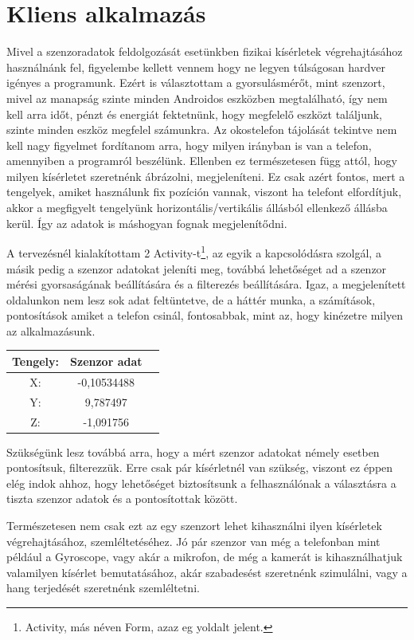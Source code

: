 \documentclass{thesis-ekf}
\theoremstyle{definition}
\theoremstyle{remark}
\begin{document}
\chapter{Kliens alkalmazás}
Mivel a szenzoradatok feldolgozását esetünkben fizikai kísérletek végrehajtásához használnánk fel, figyelembe kellett vennem hogy ne legyen túlságosan hardver igényes a programunk. Ezért is választottam a gyorsulásmérőt, mint szenzort, mivel az manapság szinte minden Androidos eszközben megtalálható, így nem kell arra időt, pénzt és energiát fektetnünk, hogy megfelelő eszközt találjunk, szinte minden eszköz megfelel számunkra. Az okostelefon tájolását tekintve nem kell nagy figyelmet fordítanom arra, hogy milyen irányban is van a telefon, amennyiben a programról beszélünk. Ellenben ez természetesen függ attól, hogy milyen kísérletet szeretnénk ábrázolni, megjeleníteni. Ez csak azért fontos, mert a tengelyek, amiket használunk fix pozíción vannak, viszont ha telefont elfordítjuk, akkor a megfigyelt tengelyünk horizontális/vertikális állásból ellenkező állásba kerül. Így az adatok is máshogyan fognak megjelenítődni.
\par A tervezésnél kialakítottam 2 Activity-t\footnote{Activity, más néven Form, azaz eg yoldalt jelent.}, az egyik a kapcsolódásra szolgál, a másik pedig a szenzor adatokat jeleníti meg, továbbá lehetőséget ad a szenzor mérési gyorsaságának beállítására és a filterezés beállítására. Igaz, a megjelenített oldalunkon nem lesz sok adat feltüntetve, de a háttér munka, a számítások, pontosítások amiket a telefon csinál, fontosabbak, mint az, hogy kinézetre milyen az alkalmazásunk.
\begin{center}
	\begin{tabular}{ |c|c|c| } 
		\hline
		Tengely: & Szenzor adat \\
		\hline\hline
		X: & -0,10534488  \\
		\hline
		Y: & 9,787497 \\
		\hline
		Z: & -1,091756 \\
		\hline
	\end{tabular}
\end{center}
\par Szükségünk lesz továbbá arra, hogy a mért szenzor adatokat némely esetben pontosítsuk, filterezzük. Erre csak pár kísérletnél van szükség, viszont ez éppen elég indok ahhoz, hogy lehetőséget biztosítsunk a felhasználónak a választásra a tiszta szenzor adatok és a pontosítottak között.
\par Természetesen nem csak ezt az egy szenzort lehet kihasználni ilyen kísérletek végrehajtásához, szemléltetéséhez. Jó pár szenzor van még a telefonban mint például a Gyroscope, vagy akár a mikrofon, de még a kamerát is kihasználhatjuk valamilyen kísérlet bemutatásához, akár szabadesést szeretnénk szimulálni, vagy a hang terjedését szeretnénk szemléltetni.
\end{document}
